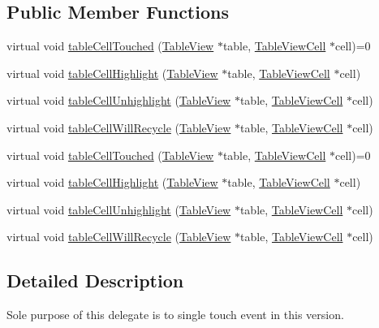 \subsection*{Public Member Functions}
\begin{DoxyCompactItemize}
\item 
virtual void \hyperlink{classTableViewDelegate_a943c7dd2eb325e7624066b915e59a9fc}{table\+Cell\+Touched} (\hyperlink{classTableView}{Table\+View} $\ast$table, \hyperlink{classTableViewCell}{Table\+View\+Cell} $\ast$cell)=0
\item 
virtual void \hyperlink{classTableViewDelegate_a5e6ad4549d76fcd3b11925c062322188}{table\+Cell\+Highlight} (\hyperlink{classTableView}{Table\+View} $\ast$table, \hyperlink{classTableViewCell}{Table\+View\+Cell} $\ast$cell)
\item 
virtual void \hyperlink{classTableViewDelegate_a02338f00d3c1c2813bd18a561587dae6}{table\+Cell\+Unhighlight} (\hyperlink{classTableView}{Table\+View} $\ast$table, \hyperlink{classTableViewCell}{Table\+View\+Cell} $\ast$cell)
\item 
virtual void \hyperlink{classTableViewDelegate_a0cd137a593de1be843739d3e85a698a9}{table\+Cell\+Will\+Recycle} (\hyperlink{classTableView}{Table\+View} $\ast$table, \hyperlink{classTableViewCell}{Table\+View\+Cell} $\ast$cell)
\item 
virtual void \hyperlink{classTableViewDelegate_a943c7dd2eb325e7624066b915e59a9fc}{table\+Cell\+Touched} (\hyperlink{classTableView}{Table\+View} $\ast$table, \hyperlink{classTableViewCell}{Table\+View\+Cell} $\ast$cell)=0
\item 
virtual void \hyperlink{classTableViewDelegate_a59258317ca789fc5a482194086ab922a}{table\+Cell\+Highlight} (\hyperlink{classTableView}{Table\+View} $\ast$table, \hyperlink{classTableViewCell}{Table\+View\+Cell} $\ast$cell)
\item 
virtual void \hyperlink{classTableViewDelegate_a32936a13ec1c6156943f37ac05e10789}{table\+Cell\+Unhighlight} (\hyperlink{classTableView}{Table\+View} $\ast$table, \hyperlink{classTableViewCell}{Table\+View\+Cell} $\ast$cell)
\item 
virtual void \hyperlink{classTableViewDelegate_a0e3448877cb9cd45ec442ba91f20933d}{table\+Cell\+Will\+Recycle} (\hyperlink{classTableView}{Table\+View} $\ast$table, \hyperlink{classTableViewCell}{Table\+View\+Cell} $\ast$cell)
\end{DoxyCompactItemize}


\subsection{Detailed Description}
Sole purpose of this delegate is to single touch event in this version. 

